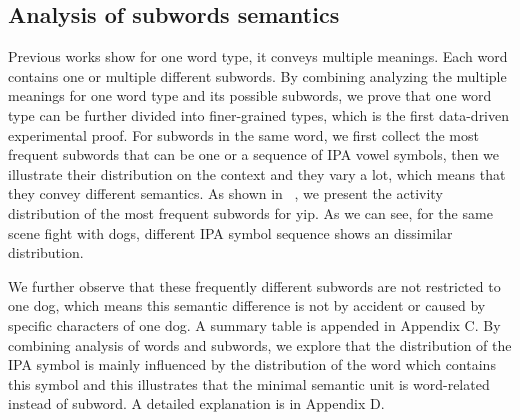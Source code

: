

\subsection{Analysis of subwords semantics}
Previous works show for one word type, it conveys multiple meanings. Each word contains one or multiple different subwords. By combining analyzing the multiple meanings for one word type and its possible subwords, we prove that one word type can be further divided into finer-grained types, which is the first data-driven experimental proof. For subwords in the same word, we first collect the most frequent subwords that can be one or a sequence of IPA vowel symbols, then we illustrate their distribution on the context and they vary a lot, which means that they convey different semantics. As shown in ~, we present the activity distribution of the most frequent subwords for yip. As we can see, for the same scene fight with dogs, different IPA symbol sequence shows an dissimilar distribution. 

We further observe that these frequently different subwords are not restricted to one dog, which means this semantic difference is not by accident or caused by specific characters of one dog. A summary table is appended in Appendix C. By combining analysis of words and subwords, we explore that the distribution of the IPA symbol is mainly influenced by the distribution of the word which contains this symbol and this illustrates that the minimal semantic unit is word-related instead of subword. A detailed explanation is in Appendix D.

